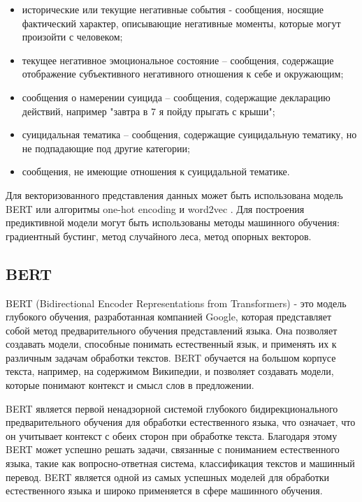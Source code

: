 \begin{itemize}
\item исторические или текущие негативные события - сообщения, носящие фактический характер, описывающие негативные моменты, которые могут произойти с человеком;
\item текущее негативное эмоциональное состояние -- сообщения, содержащие отображение субъективного негативного отношения к себе и окружающим;
\item сообщения о намерении суицида -- сообщения, содержащие декларацию действий, например "завтра в 7 я пойду прыгать с крыши";
\item суицидальная тематика -- сообщения, содержащие суицидальную тематику, но не подпадающие под другие категории;
\item сообщения, не имеющие отношения к суицидальной тематике.
\end{itemize}

Для векторизованного представления данных может быть использована модель BERT \cite{bert} или алгоритмы one-hot encoding и word2vec \cite{word2vec}. Для построения предиктивной модели могут быть использованы методы машинного обучения: градиентный бустинг, метод случайного леса, метод опорных векторов.

\subsection{BERT}

BERT (Bidirectional Encoder Representations from Transformers) - это модель глубокого обучения, разработанная компанией Google, которая представляет собой метод предварительного обучения представлений языка. Она позволяет создавать модели, способные понимать естественный язык, и применять их к различным задачам обработки текстов. BERT обучается на большом корпусе текста, например, на содержимом Википедии, и позволяет создавать модели, которые понимают контекст и смысл слов в предложении. \cite{bert}

BERT является первой ненадзорной системой глубокого бидирекционального предварительного обучения для обработки естественного языка, что означает, что он учитывает контекст с обеих сторон при обработке текста. Благодаря этому BERT может успешно решать задачи, связанные с пониманием естественного языка, такие как вопросно-ответная система, классификация текстов и машинный перевод. BERT является одной из самых успешных моделей для обработки естественного языка и широко применяется в сфере машинного обучения.

